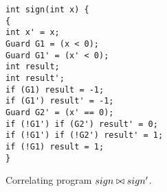 \begin{figure}
\centering
\begin{lstlisting}
int sign(int x) {
{
int x' = x;
Guard G1 = (x < 0);
Guard G1' = (x' < 0);
int result;
int result';
if (G1) result = -1;
if (G1') result' = -1;
Guard G2' = (x' == 0);
if (!G1') if (G2') result' = 0;
if (!G1') if (!G2') result' = 1;
if (!G1) result = 1;
}
\end{lstlisting}
\caption{Correlating program $sign \bowtie sign'$.}
\end{figure}
